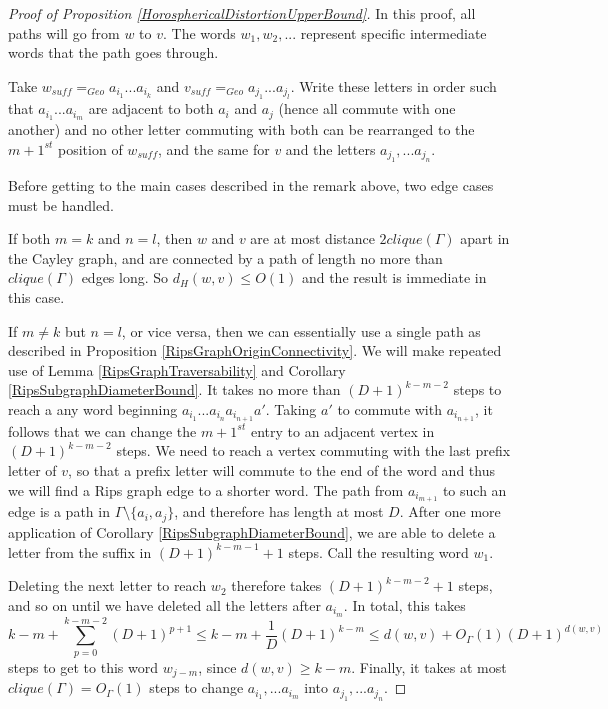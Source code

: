 \documentclass[10pt,a4paper]{amsart}
\theoremstyle{definition}
\theoremstyle{remark}
\begin{document}
	\begin{proof} [Proof of Proposition \ref{HorosphericalDistortionUpperBound}]
		
		In this proof, all paths will go from $w$ to $v$. The words $w_1, w_2, ...$ represent specific intermediate words that the path goes through.
		
		Take $w_{suff} =_{Geo} a_{i_1} ... a_{i_k}$ and $v_{suff} =_{Geo} a_{j_1} ... a_{j_l}$. Write these letters in order such that $a_{i_1} ... a_{i_m}$ are adjacent to both $a_i$ and $a_j$ (hence all commute with one another) and no other letter commuting with both can be rearranged to the $m+1^{st}$ position of $w_{suff}$, and the same for $v$ and the letters $a_{j_1}, ... a_{j_n}$.
		
		Before getting to the main cases described in the remark above, two edge cases must be handled.
		
		If both $m=k$ and $n=l$, then $w$ and $v$ are at most distance $2clique(\Gamma)$ apart in the Cayley graph, and are connected by a path of length no more than $clique(\Gamma)$ edges long. So $d_H(w, v)\le O(1)$ and the result is immediate in this case.
		
		If $m\ne k$ but $n=l$, or vice versa, then we can essentially use a single path as described in Proposition \ref{RipsGraphOriginConnectivity}. We will make repeated use of Lemma \ref{RipsGraphTraversability} and Corollary \ref{RipsSubgraphDiameterBound}. It takes no more than $(D+1)^{k-m-2}$ steps to reach a any word beginning $a_{i_1} ... a_{i_n}a_{i_{n+1}}a'$. Taking $a'$ to commute with $a_{i_{n+1}}$, it follows that we can change the $m+1^{st}$ entry to an adjacent vertex in $(D+1)^{k-m-2}$ steps. We need to reach a vertex commuting with the last prefix letter of $v$, so that a prefix letter will commute to the end of the word and thus we will find a Rips graph edge to a shorter word. The path from $a_{i_{m+1}}$ to such an edge is a path in $\Gamma\setminus  \{a_i, a_j\}$, and therefore has length at most $D$. After one more application of Corollary \ref{RipsSubgraphDiameterBound}, we are able to delete a letter from the suffix in $(D+1)^{k-m-1}+1$ steps. Call the resulting word $w_1$.
		
		Deleting the next letter to reach $w_2$ therefore takes $(D+1)^{k-m-2}+1$ steps, and so on until we have deleted all the letters after $a_{i_m}$. In total, this takes $$k-m+\sum_{p=0}^{k-m-2} (D+1)^{p+1} \le k-m+\frac{1}{D}(D+1)^{k-m}\le d(w,v)+O_\Gamma(1)(D+1)^{d(w,v)}$$ steps to get to this word $w_{j-m}$, since $d(w,v)\ge k-m$. Finally, it takes at most \newline $clique(\Gamma) = O_\Gamma(1)$ steps to change $a_{i_1}, ... a_{i_m}$ into $a_{j_1}, ... a_{j_n}$. 
		

\end{proof}
\end{document}
